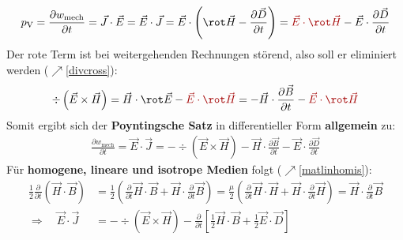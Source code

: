 \begin{equation}\begin{split}
				        p_\text{V} =\frac{\partial w_\text{mech}}{\partial t}= \vec{J}\cdot\vec{E} = \vec{E} \cdot \vec{J} = \vec{E} \cdot \left(\rot \vec{H}  - \frac{\partial \vec{D} }{\partial t}\right) =  \textcolor{red}{\vec{E} \cdot \rot \vec{H} } - \vec{E} \cdot \frac{\partial \vec{D} }{\partial t}
			    \end{split}\end{equation}
		 Der rote Term ist bei weitergehenden Rechnungen störend, also soll er eliminiert werden ($\nearrow$\ref{divcross}):
		        \begin{equation}\begin{split}
				        \div \left(\vec{E} \times \vec{H} \right) = \vec{H} \cdot\rot \vec{E} - \textcolor{red}{\vec{E} \cdot \rot \vec{H} } = - \vec{H} \cdot\frac{\partial \vec{B} }{\partial t} - \textcolor{red}{\vec{E} \cdot \rot \vec{H} }
			        \end{split}\end{equation}
	Somit ergibt sich der \textbf{Poyntingsche Satz} in differentieller Form \textbf{allgemein} zu:
		        \begin{equation}\label{poyntsat}\begin{split}
				        \boxed{\frac{\partial w_\text{mech}}{\partial t}=\vec{E} \cdot \vec{J} = - \div \left(\vec{E} \times \vec{H} \right) - \vec{H} \cdot\frac{\partial \vec{B} }{\partial t} - \vec{E} \cdot \frac{\partial \vec{D} }{\partial t} } 
			        \end{split}\end{equation}
		   Für \textbf{homogene, lineare und isotrope Medien} folgt ($\nearrow$\ref{matlinhomis}):
		        \begin{equation}\label{poyntsathli1}\begin{split}
		        		\frac{1}{2}\frac{\partial}{\partial t}\left(\vec{H} \cdot\vec{B}\right) &= \frac{1}{2}\left(\frac{\partial}{\partial t}\vec{H} \cdot\vec{B} + \vec{H} \cdot\frac{\partial}{\partial t}\vec{B}\right)= \frac{\mu}{2}\left(\frac{\partial}{\partial t}\vec{H} \cdot\vec{H} + \vec{H} \cdot\frac{\partial}{\partial t}\vec{H}\right)=\vec{H}\cdot\frac{\partial}{\partial t}\vec{B}\\
				        \Rightarrow\quad\vec{E} \cdot \vec{J} &= - \div \left(\vec{E} \times \vec{H} \right) - \frac{\partial}{\partial t}\left[\frac{1}{2} \vec{H} \cdot\vec{B}  + \frac{1}{2} \vec{E} \cdot \vec{D} \right] 
			        \end{split}\end{equation}
